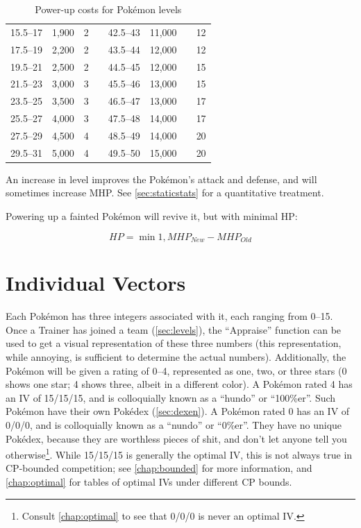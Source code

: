 \begin{table}
\begin{center}
\begin{tabular}[ht]{rrrr|rrrr}
    15.5--17 & 1,900 & 2 & & 42.5--43 & 11,000 &    & 12 \\
    17.5--19 & 2,200 & 2 & & 43.5--44 & 12,000 &    & 12 \\
    19.5--21 & 2,500 & 2 & & 44.5--45 & 12,000 &    & 15 \\
    21.5--23 & 3,000 & 3 & & 45.5--46 & 13,000 &    & 15 \\
    23.5--25 & 3,500 & 3 & & 46.5--47 & 13,000 &    & 17 \\
    25.5--27 & 4,000 & 3 & & 47.5--48 & 14,000 &    & 17 \\ 
    27.5--29 & 4,500 & 4 & & 48.5--49 & 14,000 &    & 20 \\
    29.5--31 & 5,000 & 4 & & 49.5--50 & 15,000 &    & 20 \\
    \end{tabular}
  \end{center}
  \caption{Power-up costs for Pokémon levels}
  \label{table:powerups}
\end{table}
An increase in level improves the Pokémon's attack and defense, and
  will sometimes increase MHP\@.
See \autoref{sec:staticstats} for a quantitative treatment.

Powering up a fainted Pokémon will revive it, but with minimal HP\@:

\[ HP = \min{1, MHP_{New} - MHP_{Old} } \]

\section{Individual Vectors}
\label{sec:ivs}
Each Pokémon has three integers associated with it, each ranging from 0--15.
Once a Trainer has joined a team (\autoref{sec:levels}), the ``Appraise'' function can be used to
  get a visual representation of these three numbers (this representation,
  while annoying, is sufficient to determine the actual numbers).
Additionally, the Pokémon will be given a rating of 0--4, represented as
  one, two, or three stars (0 shows one star; 4 shows three, albeit in a different color).
A Pokémon rated 4 has an IV of 15/15/15, and is colloquially known as a ``hundo'' or ``100\%er''.
Such Pokémon have their own Pokédex (\autoref{sec:dexen}).
A Pokémon rated 0 has an IV of 0/0/0, and is colloquially known as a ``nundo'' or ``0\%er''.
They have no unique Pokédex, because they are worthless pieces of shit,
  and don't let anyone tell you otherwise\footnote{Consult \autoref{chap:optimal}
  to see that 0/0/0 is never an optimal IV.}.
While 15/15/15 is generally the optimal IV, this is not always true in CP-bounded
  competition; see \autoref{chap:bounded} for more information,
  and \autoref{chap:optimal} for tables of optimal IVs under different CP bounds.

